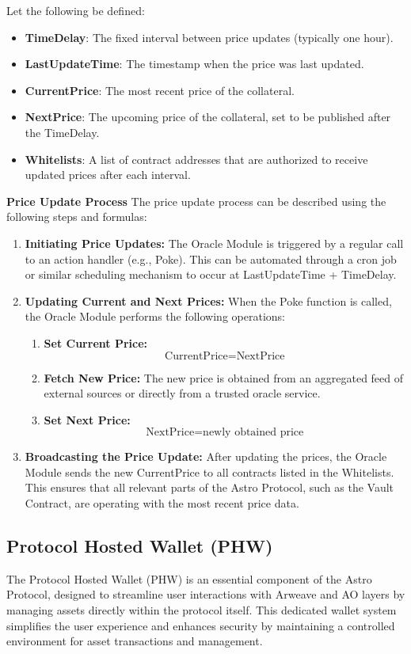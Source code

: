Let the following be defined:
\begin{itemize}
    \item \textbf{TimeDelay}: The fixed interval between price updates (typically one hour).
    \item \textbf{LastUpdateTime}: The timestamp when the price was last updated.
    \item \textbf{CurrentPrice}: The most recent price of the collateral.
    \item \textbf{NextPrice}: The upcoming price of the collateral, set to be published after the TimeDelay.
    \item \textbf{Whitelists}: A list of contract addresses that are authorized to receive updated prices after each interval.
\end{itemize}

\textbf{Price Update Process}
The price update process can be described using the following steps and formulas:
\begin{enumerate}
    \item \textbf{Initiating Price Updates:} The Oracle Module is triggered by a regular call to an action handler (e.g., Poke). This can be automated through a cron job or similar scheduling mechanism to occur at LastUpdateTime + TimeDelay.
    \item \textbf{Updating Current and Next Prices:} When the Poke function is called, the Oracle Module performs the following operations:
    \begin{enumerate}
        \item \textbf{Set Current Price:}
        \[
        \text{CurrentPrice} = \text{NextPrice}
        \]
        \item \textbf{Fetch New Price:} The new price is obtained from an aggregated feed of external sources or directly from a trusted oracle service.
        \item \textbf{Set Next Price:}
        \[
        \text{NextPrice} = \text{newly obtained price}
        \]
    \end{enumerate}
    \item \textbf{Broadcasting the Price Update:} After updating the prices, the Oracle Module sends the new CurrentPrice to all contracts listed in the Whitelists. This ensures that all relevant parts of the Astro Protocol, such as the Vault Contract, are operating with the most recent price data.
\end{enumerate}

\subsection{Protocol Hosted Wallet (PHW)}
The Protocol Hosted Wallet (PHW) is an essential component of the Astro Protocol, designed to streamline user interactions with Arweave and AO layers by managing assets directly within the protocol itself. This dedicated wallet system simplifies the user experience and enhances security by maintaining a controlled environment for asset transactions and management.

